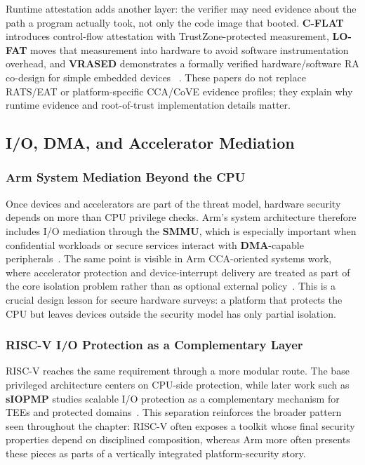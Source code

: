Runtime attestation adds another layer: the verifier may need evidence about
the path a program actually took, not only the code image that booted.
\textbf{C-FLAT} introduces control-flow attestation with TrustZone-protected
measurement, \textbf{LO-FAT} moves that measurement into hardware to avoid
software instrumentation overhead, and \textbf{VRASED} demonstrates a formally
verified hardware/software RA co-design for simple embedded devices
~\cite{abera2016cflat,dessouky2017lofat,nunes2019vrased}. These papers do not
replace RATS/EAT or platform-specific CCA/CoVE evidence profiles; they explain
why runtime evidence and root-of-trust implementation details matter.

\subsection{I/O, DMA, and Accelerator Mediation}

\subsubsection{Arm System Mediation Beyond the CPU}

Once devices and accelerators are part of the threat model, hardware security depends on more than CPU privilege checks. Arm's system architecture therefore includes I/O mediation through the \textbf{SMMU}, which is especially important when confidential workloads or secure services interact with \textbf{DMA}-capable peripherals~\cite{arm_smmu_spec}. The same point is visible in Arm CCA-oriented systems work, where accelerator protection and device-interrupt delivery are treated as part of the core isolation problem rather than as optional external policy~\cite{acai2023,bertschi2026devlore}. This is a crucial design lesson for secure hardware surveys: a platform that protects the CPU but leaves devices outside the security model has only partial isolation.

\subsubsection{RISC-V I/O Protection as a Complementary Layer}

RISC-V reaches the same requirement through a more modular route. The base privileged architecture centers on CPU-side protection, while later work such as \textbf{sIOPMP} studies scalable I/O protection as a complementary mechanism for TEEs and protected domains~\cite{riscv_privileged,feng2024siopmp}. This separation reinforces the broader pattern seen throughout the chapter: RISC-V often exposes a toolkit whose final security properties depend on disciplined composition, whereas Arm more often presents these pieces as parts of a vertically integrated platform-security story.

